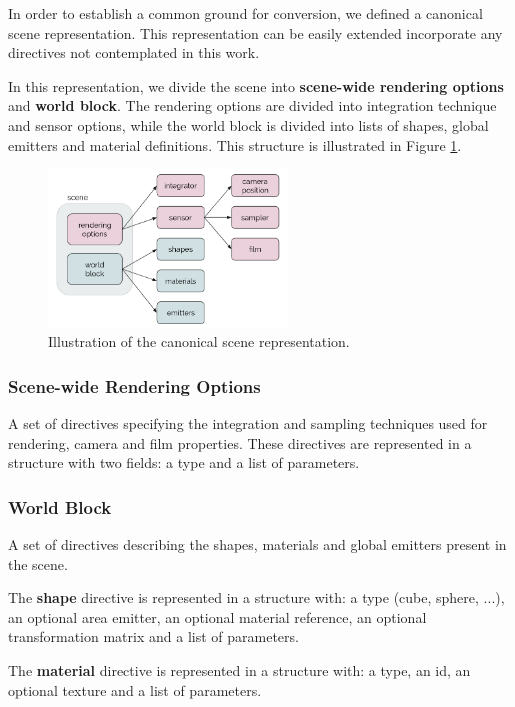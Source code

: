 \documentclass[10pt,conference]{IEEEtran}
\begin{document}
In order to establish a common ground for conversion, we 
defined a canonical scene representation. This representation can be easily 
extended incorporate any directives not contemplated in this work.

In this representation, we divide the scene into \textbf{scene-wide rendering 
options} and \textbf{world block}. The rendering options are divided into 
integration technique and sensor options, while the world block is divided into 
lists of shapes, global emitters and material definitions. This structure is 
illustrated in Figure \ref{fig:canonicalrep}.

\begin{figure}[h]
\centering
\includegraphics[width=2.5in]{figs/3_system_architecture/canonicalrep.png}
\caption{Illustration of the canonical scene representation.}
\label{fig:canonicalrep}
\end{figure}

\subsubsection{Scene-wide Rendering Options}
A set of directives specifying the integration and sampling techniques used for 
rendering, camera and film properties. These directives are represented in a 
structure with two fields: a type and a list of parameters.

\subsubsection{World Block}
A set of directives describing the shapes, materials and global emitters present 
in the scene. 

The \textbf{shape} directive is represented in a structure with: a type (cube, 
sphere, ...), an optional area emitter, an optional material reference, an 
optional transformation matrix and a list of parameters. 

The \textbf{material} directive is represented in a structure with: a type, an 
id, an optional texture and a list of parameters.
\end{document}
